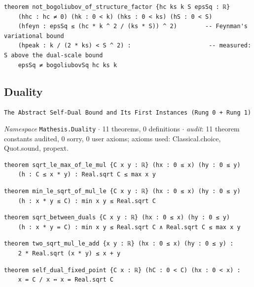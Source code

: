 \begin{lstlisting}[style=leancat]
theorem not_bogoliubov_of_structure_factor {hc ks k S epsSq : ℝ}
    (hhc : hc ≠ 0) (hk : 0 < k) (hks : 0 < ks) (hS : 0 < S)
    (hfeyn : epsSq ≤ (hc * k ^ 2 / (ks * S)) ^ 2)        -- Feynman's variational bound
    (hpeak : k / (2 * ks) < S ^ 2) :                      -- measured: S above the dual-scale bound
    epsSq ≠ bogoliubovSq hc ks k
\end{lstlisting}

\subsection{Duality}\label{appA:Duality}
{\footnotesize\raggedright\texttt{The Abstract Self-\allowbreak{}Dual Bound and Its First Instances (Rung 0 + Rung 1)}\par}
{\footnotesize\raggedright\emph{Namespace} \texttt{Mathesis.\allowbreak{}Duality} $\cdot$ 11 theorems, 0 definitions $\cdot$ \emph{audit}: 11 theorem constants audited, 0 sorry, 0 user axioms; axioms used: Classical.choice, Quot.sound, propext.\par}
\vspace{1pt}
\begin{lstlisting}[style=leancat]
theorem sqrt_le_max_of_le_mul {C x y : ℝ} (hx : 0 ≤ x) (hy : 0 ≤ y)
    (h : C ≤ x * y) : Real.sqrt C ≤ max x y
\end{lstlisting}

\begin{lstlisting}[style=leancat]
theorem min_le_sqrt_of_mul_le {C x y : ℝ} (hx : 0 ≤ x) (hy : 0 ≤ y)
    (h : x * y ≤ C) : min x y ≤ Real.sqrt C
\end{lstlisting}

\begin{lstlisting}[style=leancat]
theorem sqrt_between_duals {C x y : ℝ} (hx : 0 ≤ x) (hy : 0 ≤ y)
    (h : x * y = C) : min x y ≤ Real.sqrt C ∧ Real.sqrt C ≤ max x y
\end{lstlisting}

\begin{lstlisting}[style=leancat]
theorem two_sqrt_mul_le_add {x y : ℝ} (hx : 0 ≤ x) (hy : 0 ≤ y) :
    2 * Real.sqrt (x * y) ≤ x + y
\end{lstlisting}

\begin{lstlisting}[style=leancat]
theorem self_dual_fixed_point {C x : ℝ} (hC : 0 < C) (hx : 0 < x) :
    x = C / x ↔ x = Real.sqrt C
\end{lstlisting}

